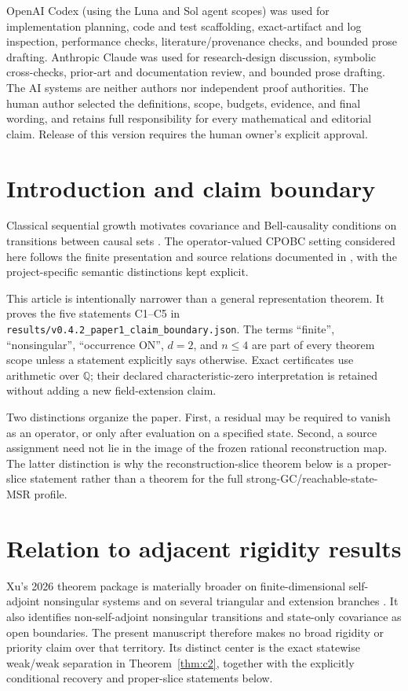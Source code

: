 \documentclass[11pt]{article}
\theoremstyle{definition}
\theoremstyle{remark}
\newcommand{\QQ}{\mathbb{Q}}
\begin{document}
OpenAI Codex (using the Luna and Sol agent scopes) was used for implementation
planning, code and test scaffolding, exact-artifact and log inspection,
performance checks, literature/provenance checks, and bounded prose drafting.
Anthropic Claude was used for research-design discussion, symbolic
cross-checks, prior-art and documentation review, and bounded prose drafting.
The AI systems are neither authors nor independent proof authorities.  The
human author selected the definitions, scope, budgets, evidence, and final
wording, and retains full responsibility for every mathematical and editorial
claim.  Release of this version requires the human owner's explicit approval.

\section{Introduction and claim boundary}

Classical sequential growth motivates covariance and Bell-causality
conditions on transitions between causal sets \cite{RideoutSorkin2000}.
The operator-valued CPOBC setting considered here follows the finite
presentation and source relations documented in \cite{SrivastavaSurya2026},
with the project-specific semantic distinctions kept explicit.

This article is intentionally narrower than a general representation theorem.
It proves the five statements C1--C5 in
\texttt{results/v0.4.2\_paper1\_claim\_boundary.json}.  The terms
``finite'', ``nonsingular'', ``occurrence ON'', \(d=2\), and \(n\leq4\)
are part of every theorem scope unless a statement explicitly says otherwise.
Exact certificates use arithmetic over \(\QQ\); their declared
characteristic-zero interpretation is retained without adding a new
field-extension claim.

Two distinctions organize the paper.  First, a residual may be required to
vanish as an operator, or only after evaluation on a specified state.
Second, a source assignment need not lie in the image of the frozen rational
reconstruction map.  The latter distinction is why the reconstruction-slice
theorem below is a proper-slice statement rather than a theorem for the full
strong-GC/reachable-state-MSR profile.

\section{Relation to adjacent rigidity results}

Xu's 2026 theorem package is materially broader on finite-dimensional
self-adjoint nonsingular systems and on several triangular and extension
branches \cite{Xu2026Relational}.  It also identifies non-self-adjoint
nonsingular transitions and state-only covariance as open boundaries.  The
present manuscript therefore makes no broad rigidity or priority claim over
that territory.  Its distinct center is the exact statewise weak/weak
separation in Theorem~\ref{thm:c2}, together with the explicitly conditional
recovery and proper-slice statements below.
\end{document}
